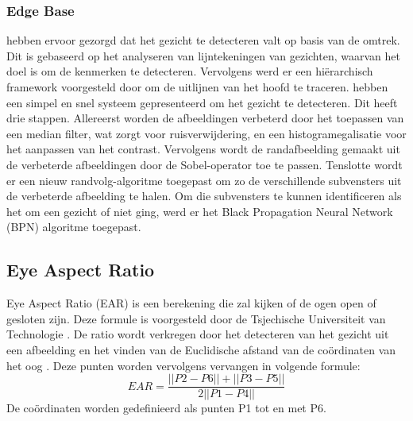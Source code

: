 \subsubsection{Edge Base}
\textcite{sakai1972} hebben ervoor gezorgd dat het gezicht te detecteren valt op basis van de omtrek. Dit is gebaseerd op het analyseren van lijntekeningen van gezichten, waarvan het doel is om de kenmerken te detecteren. Vervolgens werd er een hiërarchisch framework voorgesteld door \textcite{CRAW1987} om de uitlijnen van het hoofd te traceren. \textcite{anila2010} hebben een simpel en snel systeem gepresenteerd om het gezicht te detecteren. Dit heeft drie stappen. Allereerst worden de afbeeldingen verbeterd door het toepassen van een median filter, wat zorgt voor ruisverwijdering, en een histogramegalisatie voor het aanpassen van het contrast. Vervolgens wordt de randafbeelding gemaakt uit de verbeterde afbeeldingen door de Sobel-operator toe te passen. Tenslotte wordt er een nieuw randvolg-algoritme toegepast om zo de verschillende subvensters uit de verbeterde afbeelding te halen. Om die subvensters te kunnen identificeren als het om een gezicht of niet ging, werd er het Black Propagation Neural Network (BPN) algoritme toegepast.

\subsection{Eye Aspect Ratio}
Eye Aspect Ratio (EAR) is een berekening die zal kijken of de ogen open of gesloten zijn. Deze formule is voorgesteld door de Tsjechische Universiteit van Technologie \autocite{soukupova2016}. De ratio wordt verkregen door het detecteren van het gezicht uit een afbeelding en het vinden van de Euclidische afstand van de coördinaten van het oog \autocite{KUWAHARA202250}. Deze punten worden vervolgens vervangen in volgende formule:
\begin{equation*}
    EAR =  \frac{||P2 - P6|| + ||P3 - P5||}{2||P1-P4||}
\end{equation*}
De coördinaten worden gedefinieerd als punten P1 tot en met P6. 

